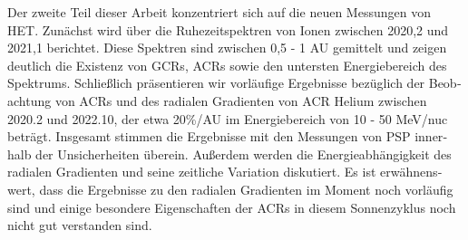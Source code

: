 \begin{otherlanguage}{ngerman}
    Der zweite Teil dieser Arbeit konzentriert sich auf die neuen Messungen von \ac{HET}. Zunächst wird über die Ruhezeitspektren von Ionen zwischen 2020,2 und 2021,1 berichtet. Diese Spektren sind zwischen 0,5 - 1 AU gemittelt und zeigen deutlich die Existenz von \acp{GCR}, \acp{ACR} sowie den untersten Energiebereich des Spektrums. Schließlich präsentieren wir vorläufige Ergebnisse bezüglich der Beobachtung von \acp{ACR} und des radialen Gradienten von \ac{ACR} Helium zwischen 2020.2 und 2022.10, der etwa 20\%/AU im Energiebereich von 10 - 50 MeV/nuc beträgt. Insgesamt stimmen die Ergebnisse mit den Messungen von \ac{PSP} innerhalb der Unsicherheiten überein. Außerdem werden die Energieabhängigkeit des radialen Gradienten und seine zeitliche Variation diskutiert. Es ist erwähnenswert, dass die Ergebnisse zu den radialen Gradienten im Moment noch vorläufig sind und einige besondere Eigenschaften der ACRs in diesem Sonnenzyklus noch nicht gut verstanden sind.
    

\end{otherlanguage}